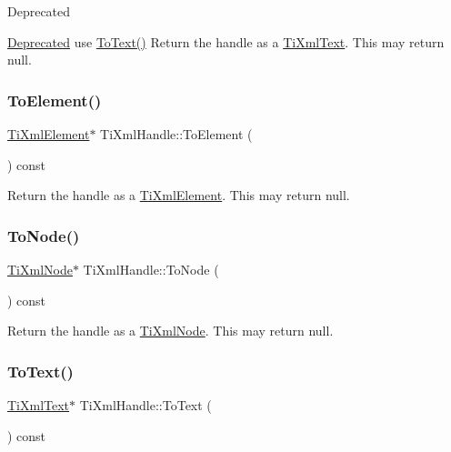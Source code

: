 \begin{DoxyRefDesc}{Deprecated}
\item[\hyperlink{deprecated__deprecated000003}{Deprecated}]use \hyperlink{class_ti_xml_handle_abde286bce1d5db0d20ec30e573278cdf}{To\+Text()} Return the handle as a \hyperlink{class_ti_xml_text}{Ti\+Xml\+Text}. This may return null. \end{DoxyRefDesc}
\hypertarget{class_ti_xml_handle_a0e3a5333550237d899b1df2b965611a1}{}\label{class_ti_xml_handle_a0e3a5333550237d899b1df2b965611a1} 
\subsubsection{\texorpdfstring{To\+Element()}{ToElement()}}
{\footnotesize\ttfamily \hyperlink{class_ti_xml_element}{Ti\+Xml\+Element}$\ast$ Ti\+Xml\+Handle\+::\+To\+Element (\begin{DoxyParamCaption}{ }\end{DoxyParamCaption}) const\hspace{0.3cm}{\ttfamily [inline]}}

Return the handle as a \hyperlink{class_ti_xml_element}{Ti\+Xml\+Element}. This may return null. \hypertarget{class_ti_xml_handle_a0e436dea2dd869a859e3a4486023f0fa}{}\label{class_ti_xml_handle_a0e436dea2dd869a859e3a4486023f0fa} 
\subsubsection{\texorpdfstring{To\+Node()}{ToNode()}}
{\footnotesize\ttfamily \hyperlink{class_ti_xml_node}{Ti\+Xml\+Node}$\ast$ Ti\+Xml\+Handle\+::\+To\+Node (\begin{DoxyParamCaption}{ }\end{DoxyParamCaption}) const\hspace{0.3cm}{\ttfamily [inline]}}

Return the handle as a \hyperlink{class_ti_xml_node}{Ti\+Xml\+Node}. This may return null. \hypertarget{class_ti_xml_handle_abde286bce1d5db0d20ec30e573278cdf}{}\label{class_ti_xml_handle_abde286bce1d5db0d20ec30e573278cdf} 
\subsubsection{\texorpdfstring{To\+Text()}{ToText()}}
{\footnotesize\ttfamily \hyperlink{class_ti_xml_text}{Ti\+Xml\+Text}$\ast$ Ti\+Xml\+Handle\+::\+To\+Text (\begin{DoxyParamCaption}{ }\end{DoxyParamCaption}) const\hspace{0.3cm}{\ttfamily [inline]}}

